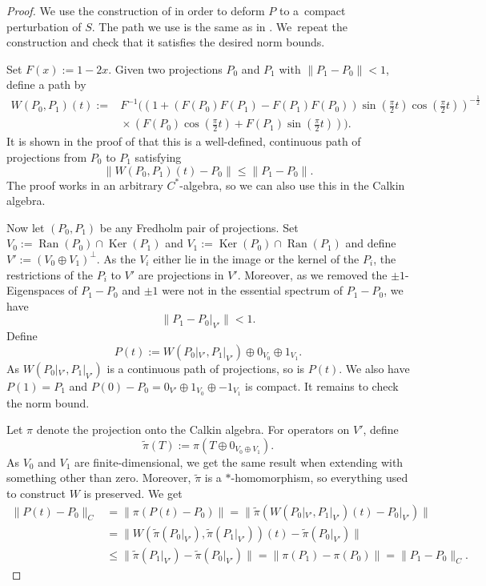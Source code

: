 \documentclass[10pt,a4paper]{amsart}
\numberwithin{equation}{section}
\DeclareMathOperator{\Ran}{Ran}
\DeclareMathOperator{\Ker}{Ker}
\begin{document}
	\begin{proof}
		We use the construction of \cite[Propositions 5.3.18 and 5.3.19]{DSW} in order to deform $P$ to a~compact perturbation of $S$. The path we use is the same as in \cite[Proposition~5.3.19]{DSW}. We~repeat the construction and check that it satisfies the desired norm bounds.
		
		Set $F(x):=1-2x$. Given two projections $P_0$ and $P_1$ with $\|P_1-P_0\|<1$, define a path by
		\begin{align*}
			W(P_0,P_1)(t):={}&F^{-1}\biggl( \left(1+ (F(P_0)F(P_1)-F(P_1)F(P_0))\sin\left(\frac{\pi}{2}t\right)\cos\left(\frac{\pi}{2}t\right)\right)^{-\frac{1}{2}} \\
			& {}\times \left(F(P_0)\cos\left(\frac{\pi}{2}t\right)+F(P_1)\sin\left(\frac{\pi}{2}t\right)\right)\biggr).
		\end{align*}
		It is shown in the proof of \cite[Proposition~5.3.18]{DSW} that this is a well-defined, continuous path of projections from $P_0$ to $P_1$ satisfying
		\[\|W(P_0,P_1)(t)-P_0\|\leq\|P_1-P_0\|.\]
		The proof works in an arbitrary $C^*$-algebra, so we can also use this in the Calkin algebra.
		
		Now let $(P_0,P_1)$ be any Fredholm pair of projections.
		Set $V_0:=\Ran(P_0)\cap\Ker(P_1)$ and $V_1:=\Ker(P_0)\cap\Ran(P_1)$ and define $V':=(V_0\oplus V_1)^\bot$. As the $V_i$ either lie in the image or the kernel of the $P_i$, the restrictions of the $P_i$ to $V'$ are projections in $V'$. Moreover, as we removed the $\pm1$-Eigenspaces of $P_1-P_0$ and $\pm1$ were not in the essential spectrum of $P_1-P_0$, we have
		\[\|P_1-P_0|_{V'}\|<1.\]
		Define
		\[P(t):= W(P_0|_{V'},P_1|_{V'})\oplus 0_{V_0}\oplus 1_{V_1}.\]
		As $W(P_0|_{V'},P_1|_{V'})$ is a continuous path of projections, so is $P(t)$. We also have $P(1)=P_1$ and $P(0)-P_0=0_{V'}\oplus 1_{V_0}\oplus -1_{V_1}$ is compact. It remains to check the norm bound.
		
		Let $\pi$ denote the projection onto the Calkin algebra. For operators on $V'$, define \[\tilde\pi(T):=\pi(T\oplus 0_{V_0\oplus V_1}).\] As $V_0$ and $V_1$ are finite-dimensional, we get the same result when extending with something other than zero. Moreover, $\tilde\pi$ is a $*$-homomorphism, so everything used to construct $W$ is preserved. We get
		\begin{align*}
			\|P(t)-P_0\|_C&=\|\pi(P(t)-P_0)\|
			 =\|\tilde\pi (W(P_0|_{V'},P_1|_{V'})(t)-P_0|_{V'})\| \\
			 &=\|W(\tilde\pi(P_0|_{V'}),\tilde\pi(P_1|_{V'}))(t)-\tilde\pi(P_0|_{V'})\|\\
			&\leq \|\tilde\pi(P_1|_{V'})-\tilde\pi(P_0|_{V'})\|
			 =\|\pi(P_1)-\pi(P_0)\|
			 =\|P_1-P_0\|_C. \tag*{\qed}
        \end{align*}
\renewcommand{\qed}{}
\end{proof}
\end{document}
